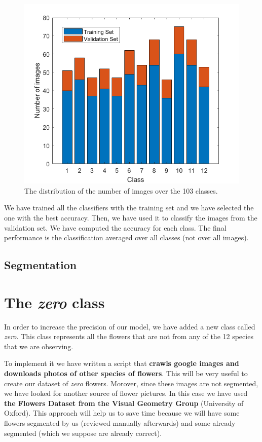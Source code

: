 \documentclass[11]{article}
\begin{document}
\begin{figure}[H]
	\centering
	\includegraphics[scale=0.45]{./images/barplot}
	
	\caption{The distribution of the number of images over the 103
classes.}
	\label{fig:barplot}
\end{figure}

We have trained all the classifiers with the training set and we have selected the one with the best accuracy. Then, we have used it to classify the images from the validation set. We have computed the accuracy for each class. The final performance is the classification averaged over all classes (not over all images).

\subsection{Segmentation}

\section{The \textit{zero} class}

In order to increase the precision of our model, we have added a new class called \textit{zero}. This class represents all the flowers that are not from any of the 12 species that we are observing.
\medskip

To implement it we have written a script that \textbf{crawls google images and downloads photos of other species of flowers}. This will be very useful to create our dataset of \textit{zero} flowers. Morover, since these images are not segmented, we have looked for another source of flower pictures. In this case we have used \textbf{the Flowers Dataset from the Visual Geometry Group} (University of Oxford). This approach will help us to save time because we will have some flowers segmented by us (reviewed manually afterwards) and some already segmented (which we suppose are already correct).
\medskip
\end{document}
